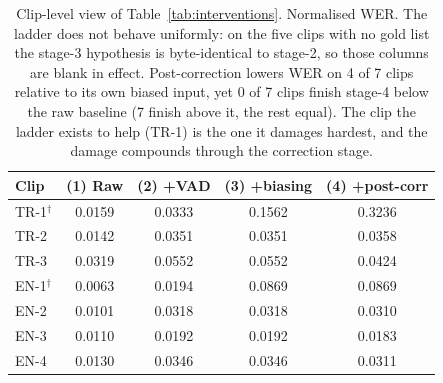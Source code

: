 \begin{table}[t]
\caption{Clip-level view of Table~\ref{tab:interventions}. Normalised WER. The ladder
does not behave uniformly: on the five clips with no gold list the stage-3 hypothesis is
byte-identical to stage-2, so those columns are blank in effect. Post-correction lowers WER
on 4 of 7 clips relative to its own biased input, yet 0 of
7 clips finish stage-4 below the raw baseline (7 finish above it, the
rest equal). The clip the ladder exists to help (TR-1) is the one it damages hardest, and the
damage compounds through the correction stage.}
\label{tab:interventions_perclip}
\centering
\renewcommand{\arraystretch}{1.1}
\setlength{\tabcolsep}{4pt}
\begin{tabular}{@{}lcccc@{}}
\toprule
\textbf{Clip} & \textbf{(1) Raw} & \textbf{(2) +VAD} &
\textbf{(3) +biasing} & \textbf{(4) +post-corr} \\
\midrule
TR-1$^{\dagger}$ & 0.0159 & 0.0333 & 0.1562 & 0.3236 \\
TR-2 & 0.0142 & 0.0351 & 0.0351 & 0.0358 \\
TR-3 & 0.0319 & 0.0552 & 0.0552 & 0.0424 \\
EN-1$^{\dagger}$ & 0.0063 & 0.0194 & 0.0869 & 0.0869 \\
EN-2 & 0.0101 & 0.0318 & 0.0318 & 0.0310 \\
EN-3 & 0.0110 & 0.0192 & 0.0192 & 0.0183 \\
EN-4 & 0.0130 & 0.0346 & 0.0346 & 0.0311 \\
\bottomrule
\end{tabular}
\end{table}
